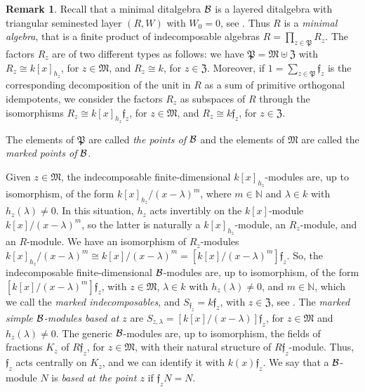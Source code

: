\documentclass{article}
\theoremstyle{definition}
\newtheorem{remark}[theorem]{Remark}
\renewcommand{\frak}{\mathfrak}
\newcommand{\hueca}[1]{\mathbb{#1}}
\begin{document}
\begin{remark}\label{L: ditalg minimales} Recall that a minimal ditalgebra ${\cal B}$ is a layered ditalgebra with triangular seminested layer $(R,W)$ with $W_0=0$, see \cite[\S23]{BSZ}. Thus $R$ is a \emph{minimal algebra}, that is a  finite product of indecomposable  algebras $R=\prod_{z\in \frak{P}}R_z$.
The factors $R_z$ are of two different types as follows: 
we have  $\frak{P}=\frak{M}\uplus \frak{Z}$ with  
$R_z\cong k[x]_{h_z}$,  for 
$z\in \frak{M}$, and $R_z\cong k$, for $z\in \frak{Z}$.
 Moreover, if $1=\sum_{z\in \frak{P}}\frak{f}_z$ is the corresponding decomposition of the unit in $R$ as a sum of primitive orthogonal idempotents,  we consider the factors $R_z$ as subspaces of $R$ through the isomorphisms $R_z\cong k[x]_{h_z}\frak{f}_z$, for $z\in \frak{M}$, and $R_z\cong k\frak{f}_z$, for $z\in \frak{Z}$.  

The elements of $\frak{P}$ are called \emph{the points of} ${\cal B}$ and the elements of $\frak{M}$ are called the \emph{marked points of} ${\cal B}$. 

Given $z\in \frak{M}$, the indecomposable finite-dimensional $k[x]_{h_z}$-modules are, up to isomorphism, of the form $k[x]_{h_z}/(x-\lambda)^m$, where $m\in \hueca{N}$ and $\lambda\in k$ with $h_z(\lambda)\not=0$. In this situation, $h_z$ acts invertibly on the  $k[x]$-module $k[x]/(x-\lambda)^m$, so the latter is naturally a $k[x]_{h_z}$-module, an $R_z$-module, and an $R$-module. We have an isomorphism of $R_z$-modules  $k[x]_{h_z}/(x-\lambda)^m\cong k[x]/(x-\lambda)^m=[k[x]/(x-\lambda)^m]\frak{f}_z$. 
So, the indecomposable finite-dimensional ${\cal B}$-modules are, up to isomorphism, of the form  
$[k[x]/(x-\lambda)^m]\frak{f}_z$, with $z\in \frak{M}$, $\lambda\in k$ with  $h_z(\lambda)\not=0$, and $m\in \hueca{N}$, which we call the \emph{marked indecomposables}, and $S_{\frak{f}_z}=k\frak{f}_z$, with $z\in \frak{Z}$, see \cite[(32.3)]{BSZ}. The \emph{marked simple  ${\cal B}$-modules based at $z$} are     $S_{z,\lambda}=[k[x]/(x-\lambda)]\frak{f}_z$, for $z\in \frak{M}$ and $h_z(\lambda)\not=0$. The generic ${\cal B}$-modules are, up to isomorphism,  the fields of fractions $K_z$ of $R\frak{f}_z$, for $z\in \frak{M}$, with their  natural structure of $R\frak{f}_z$-module. Thus, $\frak{f}_z$ acts centrally on $K_z$, and we can identify it with $k(x)\frak{f}_z$.  We say that a ${\cal B}$-module $N$ is \emph{based at the point $z$} if $\frak{f}_zN=N$. 
\end{remark}
\end{document}
